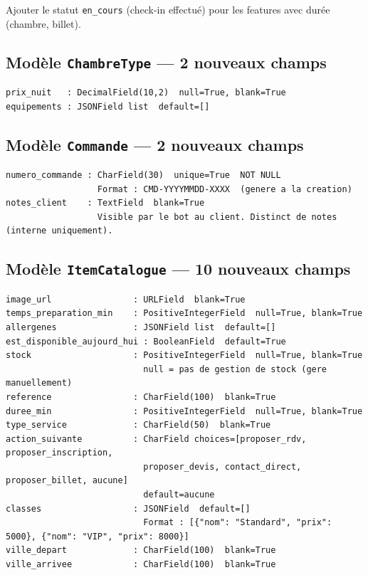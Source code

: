 \documentclass[11pt,a4paper]{article}
\newcommand{\slug}[1]{\texttt{\color{AGTDark}#1}}
\begin{document}
Ajouter le statut \texttt{en\_cours} (check-in effectué) pour les features
avec durée (chambre, billet).

\subsection{Modèle \slug{ChambreType} — 2 nouveaux champs}

\begin{lstlisting}
prix_nuit   : DecimalField(10,2)  null=True, blank=True
equipements : JSONField list  default=[]
\end{lstlisting}

\subsection{Modèle \slug{Commande} — 2 nouveaux champs}

\begin{lstlisting}
numero_commande : CharField(30)  unique=True  NOT NULL
                  Format : CMD-YYYYMMDD-XXXX  (genere a la creation)
notes_client    : TextField  blank=True
                  Visible par le bot au client. Distinct de notes (interne uniquement).
\end{lstlisting}

\subsection{Modèle \slug{ItemCatalogue} — 10 nouveaux champs}

\begin{lstlisting}
image_url                : URLField  blank=True
temps_preparation_min    : PositiveIntegerField  null=True, blank=True
allergenes               : JSONField list  default=[]
est_disponible_aujourd_hui : BooleanField  default=True
stock                    : PositiveIntegerField  null=True, blank=True
                           null = pas de gestion de stock (gere manuellement)
reference                : CharField(100)  blank=True
duree_min                : PositiveIntegerField  null=True, blank=True
type_service             : CharField(50)  blank=True
action_suivante          : CharField choices=[proposer_rdv, proposer_inscription,
                           proposer_devis, contact_direct, proposer_billet, aucune]
                           default=aucune
classes                  : JSONField  default=[]
                           Format : [{"nom": "Standard", "prix": 5000}, {"nom": "VIP", "prix": 8000}]
ville_depart             : CharField(100)  blank=True
ville_arrivee            : CharField(100)  blank=True
\end{lstlisting}
\end{document}
